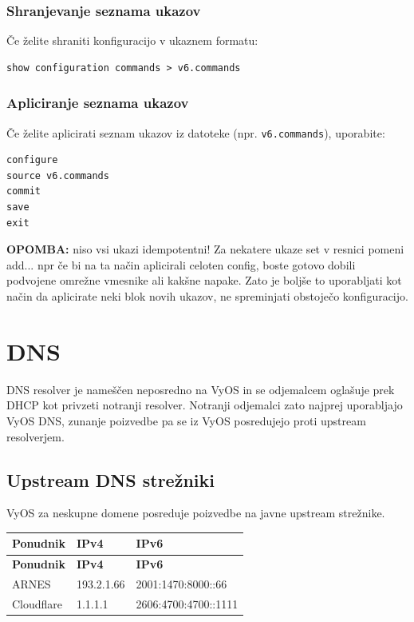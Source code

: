 \documentclass[a4paper,11pt]{article}
\begin{document}
\subsubsection{Shranjevanje seznama ukazov}
Če želite shraniti konfiguracijo v ukaznem formatu:
\begin{lstlisting}
show configuration commands > v6.commands
\end{lstlisting}

\subsubsection{Apliciranje seznama ukazov}
Če želite aplicirati seznam ukazov iz datoteke (npr. \verb|v6.commands|), uporabite:

\begin{lstlisting}
configure
source v6.commands
commit
save
exit
\end{lstlisting}

\textbf{OPOMBA:} niso vsi ukazi idempotentni! Za nekatere ukaze set v resnici pomeni add...
npr če bi na ta način aplicirali celoten config, boste gotovo dobili podvojene omrežne vmesnike ali kakšne napake.
Zato je boljše to uporabljati kot način da aplicirate neki blok novih ukazov, ne spreminjati obstoječo konfiguracijo.

\section{DNS}
DNS resolver je nameščen neposredno na VyOS in se odjemalcem oglašuje prek DHCP kot privzeti notranji resolver. Notranji odjemalci zato najprej uporabljajo VyOS DNS, zunanje poizvedbe pa se iz VyOS posredujejo proti upstream resolverjem.

\subsection{Upstream DNS strežniki}
VyOS za neskupne domene posreduje poizvedbe na javne upstream strežnike.
\begin{longtable}{|p{3.4cm}|p{4.0cm}|p{5.0cm}|}
\hline
\textbf{Ponudnik} & \textbf{IPv4} & \textbf{IPv6} \\
\hline
\endfirsthead
\hline
\textbf{Ponudnik} & \textbf{IPv4} & \textbf{IPv6} \\
\hline
\endhead
ARNES & 193.2.1.66 & 2001:1470:8000::66 \\
\hline
Cloudflare & 1.1.1.1 & 2606:4700:4700::1111 \\
\hline
\end{longtable}
\end{document}
